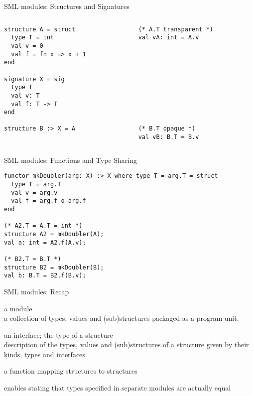 \documentclass{beamer}
\begin{document}
\begin{frame}[fragile]{SML modules: Structures and Signatures}
\begin{columns}
\begin{column}[t]{5cm}
\begin{verbatim}
structure A = struct
  type T = int
  val v = 0
  val f = fn x => x + 1
end

signature X = sig
  type T
  val v: T
  val f: T -> T
end

structure B :> X = A
\end{verbatim}
\end{column}
\begin{column}[t]{5cm}
\begin{verbatim}
(* A.T transparent *)
val vA: int = A.v










(* B.T opaque *)
val vB: B.T = B.v
\end{verbatim}
\end{column}
\end{columns}
\end{frame}

\begin{frame}[fragile]{SML modules: Functions and Type Sharing}
\begin{verbatim}
functor mkDoubler(arg: X) :> X where type T = arg.T = struct
  type T = arg.T
  val v = arg.v
  val f = arg.f o arg.f
end

(* A2.T = A.T = int *)
structure A2 = mkDoubler(A);
val a: int = A2.f(A.v);

(* B2.T = B.T *)
structure B2 = mkDoubler(B);
val b: B.T = B2.f(B.v);
\end{verbatim}
\end{frame}

\begin{frame}{SML modules: Recap}
\begin{description}
\item[structure] a module\\a collection of types, values and
  (sub)structures packaged as a program unit.
\item[signature] an interface; the type of a structure\\description of
  the types, values and (sub)structures of a structure given by their
  kinds, types and interfaces.
\item[functor] a function mapping structures to structures
\item[type-sharing] enables stating that types specified in separate
  modules are actually equal
\end{description}
\end{frame}
\end{document}
